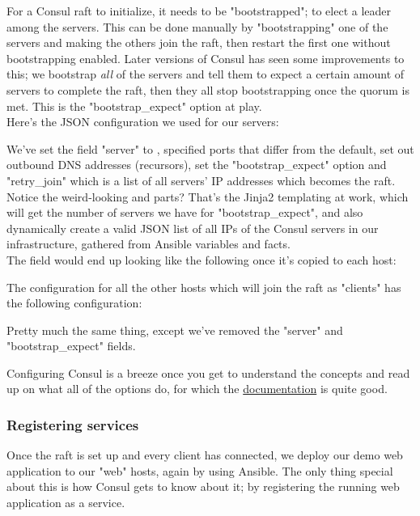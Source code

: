                For a Consul raft to initialize, it needs to be "bootstrapped"; to elect a leader among the servers. This can be done manually by "bootstrapping" one of the servers and making the others join the raft, then restart the first one without bootstrapping enabled. Later versions of Consul has seen some improvements to this; we bootstrap \textit{all} of the servers and tell them to expect a certain amount of servers to complete the raft, then they all stop bootstrapping once the quorum is met. This is the "bootstrap\_expect" option at play.\\
                
                Here's the JSON configuration we used for our servers:
                
                We've set the field "server" to , specified ports that differ from the default, set out outbound DNS addresses (recursors), set the "bootstrap\_expect" option and "retry\_join" which is a list of all servers' IP addresses which becomes the raft.\\
                
                Notice the weird-looking  and  parts? That's the Jinja2 templating at work, which will get the number of servers we have for "bootstrap\_expect", and also dynamically create a valid JSON list of all IPs of the Consul servers in our infrastructure, gathered from Ansible variables and facts.\\
                The  field would end up looking like the following once it's copied to each host:
                
                The configuration for all the other hosts which will join the raft as "clients" has the following configuration:
                
                Pretty much the same thing, except we've removed the "server" and "bootstrap\_expect" fields.
                
                Configuring Consul is a breeze once you get to understand the concepts and read up on what all of the options do, for which the \href{https://www.consul.io/docs/agent/options.html}{documentation} is quite good.
            
            \subsubsection{Registering services}
                Once the raft is set up and every client has connected, we deploy our demo web application to our "web" hosts, again by using Ansible. The only thing special about this is how Consul gets to know about it; by registering the running web application as a service.\\
                
